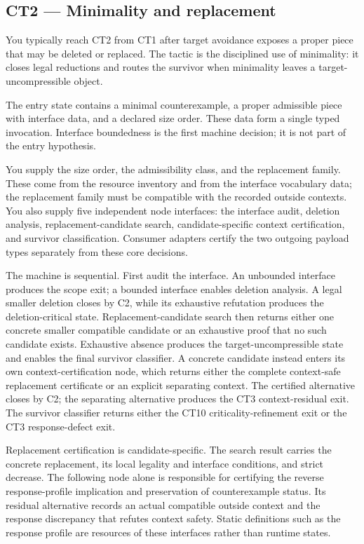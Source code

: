 \subsection{CT2 --- Minimality and replacement}\label{ct:2}\label{minimal-counterexample}

You typically reach CT2 from CT1 after target avoidance exposes a proper
piece that may be deleted or replaced.  The tactic is the disciplined use
of minimality: it closes legal reductions and routes the survivor when
minimality leaves a target-uncompressible object.

The entry state contains a minimal counterexample, a proper admissible
piece with interface data, and a declared size order.  These data form a
single typed invocation.  Interface boundedness is the first machine
decision; it is not part of the entry hypothesis.

You supply the size order, the admissibility class, and the replacement
family.  These come from the resource inventory and from the interface
vocabulary data; the replacement family must be compatible with the
recorded outside contexts.  You also supply five independent node
interfaces: the interface audit, deletion analysis, replacement-candidate
search, candidate-specific context certification, and survivor
classification.  Consumer adapters certify the two outgoing payload types
separately from these core decisions.

The machine is sequential.  First audit the interface.  An unbounded
interface produces the scope exit; a bounded interface enables deletion
analysis.  A legal smaller deletion closes by C2, while its exhaustive
refutation produces the deletion-critical state.  Replacement-candidate
search then returns either one concrete smaller compatible candidate or an
exhaustive proof that no such candidate exists.  Exhaustive absence produces
the target-uncompressible state and enables the final survivor classifier.
A concrete candidate instead enters its own context-certification node,
which returns either the complete context-safe replacement certificate or
an explicit separating context.  The certified alternative closes by C2;
the separating alternative produces the CT3 context-residual exit.  The
survivor classifier returns either the CT10 criticality-refinement exit or
the CT3 response-defect exit.

Replacement certification is candidate-specific.  The search result carries
the concrete replacement, its local legality and interface conditions, and
strict decrease.  The following node alone is responsible for certifying
the reverse response-profile implication and preservation of counterexample
status.  Its residual alternative records an actual compatible outside
context and the response discrepancy that refutes context safety.  Static
definitions such as the response profile are resources of these interfaces
rather than runtime states.

